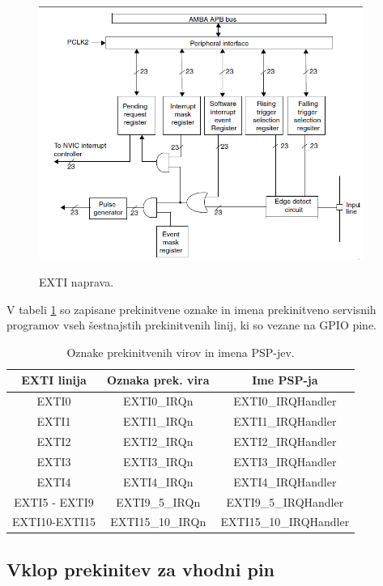 \documentclass[12pt,letterpaper]{article}
\begin{document}
\begin{figure}[ht!]
  \centering
  \caption{EXTI naprava.}
  \includegraphics[width=300pt]{images/vaja6/exti.png}
  \label{exti}
\end{figure}

V tabeli \ref{EXTIIRQn} so zapisane prekinitvene oznake in imena prekinitveno servisnih programov vseh šestnajstih prekinitvenih linij, ki so vezane na GPIO pine.

\begin{table}[ht!]
\caption{Oznake prekinitvenih virov in imena PSP-jev.}
\begin{center}
\begin{tabular}{c|c|c}
\textbf{EXTI linija}   & \textbf{Oznaka prek. vira} & \textbf{Ime PSP-ja}             \\ \hline
EXTI0         & EXTI0\_IRQn       & EXTI0\_IRQHandler      \\ \hline
EXTI1         & EXTI1\_IRQn       & EXTI1\_IRQHandler      \\ \hline
EXTI2         & EXTI2\_IRQn       & EXTI2\_IRQHandler      \\ \hline
EXTI3         & EXTI3\_IRQn       & EXTI3\_IRQHandler      \\ \hline
EXTI4         & EXTI4\_IRQn       & EXTI4\_IRQHandler      \\ \hline
EXTI5 - EXTI9 & EXTI9\_5\_IRQn    & EXTI9\_5\_IRQHandler   \\ \hline
EXTI10-EXTI15 & EXTI15\_10\_IRQn  & EXTI15\_10\_IRQHandler \\
\end{tabular}
\label{EXTIIRQn}
\end{center}
\end{table}


\subsection*{Vklop prekinitev za vhodni pin}
\end{document}
